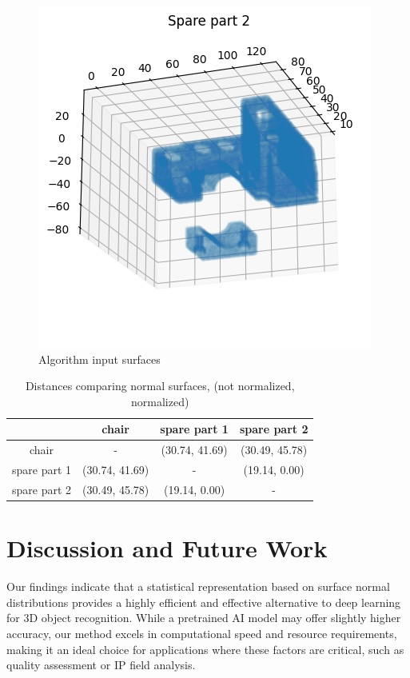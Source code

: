 \documentclass{article}
\begin{document}
\begin{figure}[!htb]
  \caption{Algorithm input surfaces}
\endminipage\hfill
{}%
  \includegraphics[width=\linewidth]{pics/spare_part_2_cp.jpg}
\endminipage
\end{figure}

\begin{table}[H]
    \centering
    \begin{tabular}{c|c|c|c}
        \toprule
                & chair & spare part 1 & spare part 2\\
        \midrule
         chair & - & (30.74, 41.69) & (30.49, 45.78)\\
        \midrule
         spare part 1 & (30.74, 41.69) & - & (19.14, 0.00)\\
        \midrule
         spare part 2 & (30.49, 45.78) & (19.14, 0.00) & -\\
        \bottomrule
    \end{tabular}
    \caption{Distances comparing normal surfaces, (not normalized, normalized)}
    \label{tab:my_label}
\end{table}

\section{Discussion and Future Work}
Our findings indicate that a statistical representation based on surface normal distributions provides a highly efficient and effective alternative to deep learning for 3D object recognition. While a pretrained AI model may offer slightly higher accuracy, our method excels in computational speed and resource requirements, making it an ideal choice for applications where these factors are critical, such as quality assessment or IP field analysis.
\end{document}
